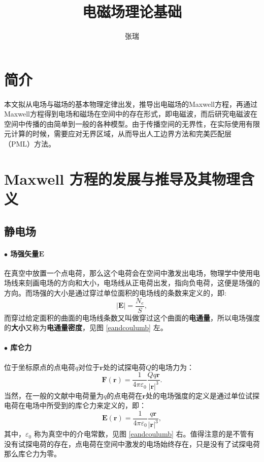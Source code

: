 \documentclass[10pt,reqno, final]{ctexart}
\begin{document}
\begin{titlepage}
\title{ \textbf{电磁场理论基础}}
\author{张\quad 瑞}
\maketitle
\pagestyle{empty}
\thispagestyle{empty}
\end{titlepage}
\begin{titlepage} 
\tableofcontents
\listoffigures
\end{titlepage}
\section{简介}
本文拟从电场与磁场的基本物理定律出发，推导出电磁场的Maxwell方程，再通过Maxwell方程得到电场和磁场在空间中的存在形式，即电磁波，而后研究电磁波在空间中传播的由简单到一般的各种模型。由于传播空间的无界性，在实际使用有限元计算的时候，需要应对无界区域，从而导出人工边界方法和完美匹配层 （PML）方法。

\section{Maxwell 方程的发展与推导及其物理含义}
\subsection{静电场}
\paragraph{$\bullet$ 场强矢量$\bm{E}$}在真空中放置一个点电荷，那么这个电荷会在空间中激发出电场，物理学中使用电场线来刻画电场的方向和大小，电场线从正电荷出发，指向负电荷，这便是场强的方向。而场强的大小是通过穿过单位面积的电场线的条数来定义的，即:
\begin{equation}\label{electricfield}
|\bm{E}|=\frac{N_e}{S},
\end{equation}
而穿过给定面积的曲面的电场线条数又叫做穿过这个曲面的\textbf{电通量}，所以电场强度的\textbf{大小}又称为\textbf{电通量密度}，见图 \ref{eandcoulumb} 左。
\paragraph{$\bullet$ 库仑力}位于坐标原点的点电荷$q$对位于$\bm{r}$处的试探电荷$Q$的电场力为：
\begin{equation}\label{coulombforce}
\bm{F}(\bm{r}) = \frac{1}{4\pi\varepsilon_0}\frac{Qq\bm{r}}{|\bm{r}|^3}.
\end{equation}
当然，在一般的文献中电荷量为$q$的点电荷在$\bm{r}$处的电场强度的定义是通过单位试探电荷在电场中所受到的库仑力来定义的，即：
\begin{equation}\label{columb}
\bm{E}(\bm{r})=\frac{1}{4\pi\varepsilon_0}\frac{q\bm{r}}{|\bm{r}|^3},
\end{equation}
其中，$\varepsilon_0$ 称为真空中的介电常数，见图 \ref{eandcoulumb} 右。值得注意的是不管有没有试探电荷的存在，点电荷在空间中激发的电场始终存在，只是没有了试探电荷那么库仑力为零。
\end{document}
